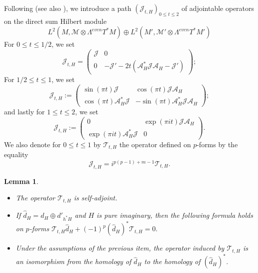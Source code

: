 \documentclass[12pt]{amsart}
\theoremstyle{plain}
\newtheorem{lemma}[theorem]{Lemma}
\theoremstyle{definition}
\theoremstyle{remark}
\begin{document}
{Following \cite{Keswani} (see also \cite{HigsonRoeRho}), we introduce a  path $({\mathcal J}_{t, H})_{0\leq t\leq 2}$ of adjointable operators on the direct sum Hilbert module 
$$
L^2(M, {\mathcal M}\otimes \Lambda^{even}T^*M) \oplus L^2(M', {\mathcal M}'\otimes \Lambda^{even}T^*M')
$$ 
For   $0\leq t\leq 1/2$, we set
$$
{\mathcal J}_{t, H} = \left(\begin{array}{cc} {\mathcal J} & 0 \\ 0 & -{\mathcal J} ' - 2t ({\mathcal A}_H^* {\mathcal J} {\mathcal A}_H - {\mathcal J} ')
\end{array}\right);
$$
For $1/2\leq t \leq 1$, we set
$$
{\mathcal J}_{t, H} := \left(\begin{array}{cc} \sin (\pi t) {\mathcal J} & \cos (\pi t) {\mathcal J} {\mathcal A}_H \\ \cos (\pi t) {\mathcal A}_H^* {\mathcal J} & - \sin (\pi t) {\mathcal A}_H^* {\mathcal J} {\mathcal A}_H
\end{array}\right);
$$
and lastly for $1\leq t\leq 2$, we set
$$
{\mathcal J}_{t, H} :=   \left(\begin{array}{cc} 0 & \exp (\pi i t) {\mathcal J} {\mathcal A}_H \\ \exp (\pi i t) {\mathcal A}_H^* {\mathcal J} & 0
\end{array}\right).
$$
We also denote for $0\leq t \leq 1$ by ${\mathcal T}_{t, H}$ the operator defined on $p$-forms by the equality
$$
{\mathcal J}_{t, H} = i ^{p(p-1)+m-1} {\mathcal T}_{t, H}.
$$

\begin{lemma}
\begin{itemize}
\item The operator ${\mathcal T}_{t, H}$ is self-adjoint. 
\item If ${\hat d}_H=d_H\oplus d'_{h^*H}$ and $H$ is pure imaginary, then the following formula holds on $p$-forms $
 {\mathcal T}_{t, H} {\hat d}_H + (-1)^p ({\hat d}_H)^*  {\mathcal T}_{t, H} = 0.$
\item Under the assumptions of the previous item, the operator induced by ${\mathcal T}_{t,H}$ is an isomorphism from the homology of ${\hat d}_H$ to the homology of $({\hat d}_H)^*$.
\end{itemize}
\end{lemma}

}
\end{document}
